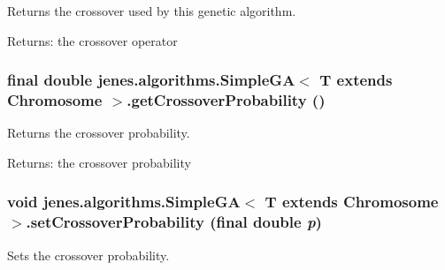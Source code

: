 Returns the crossover used by this genetic algorithm.

\begin{Desc}
\item[Returns:]the crossover operator \end{Desc}
\hypertarget{classjenes_1_1algorithms_1_1_simple_g_a_3_01_t_01extends_01_chromosome_01_4_85ed250d10211b0faf798bef2663ec9f}{
\subsubsection[getCrossoverProbability]{\setlength{\rightskip}{0pt plus 5cm}final double jenes.algorithms.SimpleGA$<$ T extends Chromosome $>$.getCrossoverProbability ()}}
\label{classjenes_1_1algorithms_1_1_simple_g_a_3_01_t_01extends_01_chromosome_01_4_85ed250d10211b0faf798bef2663ec9f}


Returns the crossover probability.

\begin{Desc}
\item[Returns:]the crossover probability \end{Desc}
\hypertarget{classjenes_1_1algorithms_1_1_simple_g_a_3_01_t_01extends_01_chromosome_01_4_639f43de8d71ae3e28077c4510eae64e}{
\subsubsection[setCrossoverProbability]{\setlength{\rightskip}{0pt plus 5cm}void jenes.algorithms.SimpleGA$<$ T extends Chromosome $>$.setCrossoverProbability (final double {\em p})}}
\label{classjenes_1_1algorithms_1_1_simple_g_a_3_01_t_01extends_01_chromosome_01_4_639f43de8d71ae3e28077c4510eae64e}


Sets the crossover probability.

